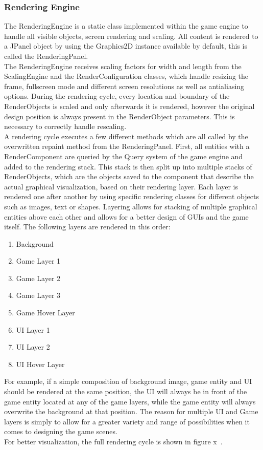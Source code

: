 \subsubsection{Rendering Engine}\label{subsubsec:graphics-engine}
The RenderingEngine is a static class implemented within the game engine to handle all visible objects, screen rendering and scaling.
All content is rendered to a JPanel object by using the Graphics2D instance available by default, this is called the RenderingPanel.
\\
The RenderingEngine receives scaling factors for width and length from the ScalingEngine and the RenderConfiguration classes, which handle resizing the frame,
fullscreen mode and different screen resolutions as well as antialiasing options.
During the rendering cycle, every location and boundary of the RenderObjects is scaled and only afterwards it is rendered, however the original design position
is always present in the RenderObject parameters.
This is necessary to correctly handle rescaling.
\\
A rendering cycle executes a few different methods which are all called by the overwritten repaint method from the RenderingPanel.
First, all entities with a RenderComponent are queried by the Query system of the game engine and added to the rendering stack.
This stack is then split up into multiple stacks of RenderObjects, which are the objects saved to the component that describe the actual graphical visualization, based
on their rendering layer.
Each layer is rendered one after another by using specific rendering classes for different objects such as images, text or shapes.
Layering allows for stacking of multiple graphical entities above each other and allows for a better design of GUIs and the game itself.
The following layers are rendered in this order:
\begin{enumerate}
    \item Background
    \item Game Layer 1
    \item Game Layer 2
    \item Game Layer 3
    \item Game Hover Layer
    \item UI Layer 1
    \item UI Layer 2
    \item UI Hover Layer
\end{enumerate}
For example, if a simple composition of background image, game entity and UI should be rendered at the same position, the UI will always be in front of the game entity located at any of the game layers,
while the game entity will always overwrite the background at that position.
The reason for multiple UI and Game layers is simply to allow for a greater variety and range of possibilities when it comes to designing the game scenes.
\\
For better visualization, the full rendering cycle is shown in figure x~.

